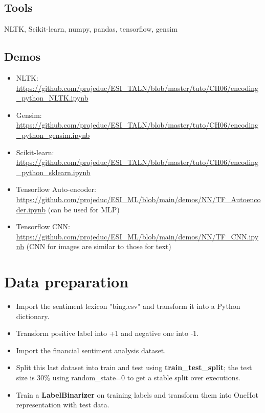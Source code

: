 \documentclass[11pt, a4paper]{article}
\begin{document}
\subsection*{Tools}

NLTK, Scikit-learn, numpy, pandas, tensorflow, gensim


\subsection*{Demos}

\begin{itemize}
	\item NLTK: \url{https://github.com/projeduc/ESI_TALN/blob/master/tuto/CH06/encoding_python_NLTK.ipynb}
	\item Gensim: \url{https://github.com/projeduc/ESI_TALN/blob/master/tuto/CH06/encoding_python_gensim.ipynb}
	\item Scikit-learn: \url{https://github.com/projeduc/ESI_TALN/blob/master/tuto/CH06/encoding_python_sklearn.ipynb}
	\item Tensorflow Auto-encoder: \url{https://github.com/projeduc/ESI_ML/blob/main/demos/NN/TF_Autoencoder.ipynb} (can be used for MLP)
	\item Tensorflow CNN: \url{https://github.com/projeduc/ESI_ML/blob/main/demos/NN/TF_CNN.ipynb} (CNN for images are similar to those for text)
\end{itemize}


\section{Data preparation}

\begin{itemize}
	\item Import the sentiment lexicon "bing.csv" and transform it into a Python dictionary.
	\item Transform positive label into +1 and negative one into -1.
	\item Import the financial sentiment analysis dataset.
	\item Split this last dataset into train and test using \textbf{train\_test\_split}; the test size is 30\% using random\_state=0 to get a stable split over executions.
	\item Train a \textbf{LabelBinarizer} on training labels and transform them into OneHot representation with test data.
\end{itemize}
\end{document}
